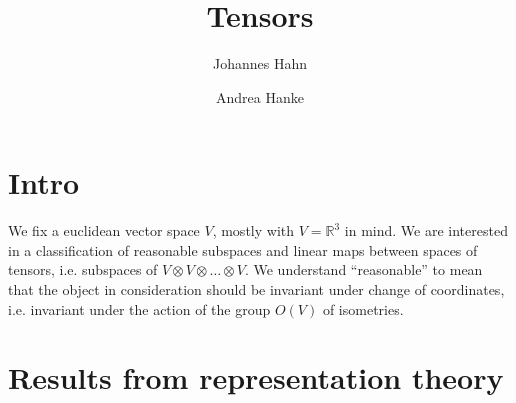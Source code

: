 \documentclass[fontsize=11pt,fleqn,a4paper]{scrartcl}
\author{Johannes Hahn \and Andrea Hanke}
\title{Tensors}
\begin{document}
\maketitle

\section{Intro}

We fix a euclidean vector space $V$, mostly with $V=\mathbb{R}^3$ in mind. We are interested in a classification of reasonable subspaces and linear maps between spaces of tensors, i.e. subspaces of $V\otimes V\otimes \ldots \otimes V$. We understand \enquote{reasonable} to mean that the object in consideration should be invariant under change of coordinates, i.e. invariant under the action of the group $O(V)$ of isometries.

\section{Results from representation theory}


\end{document}
